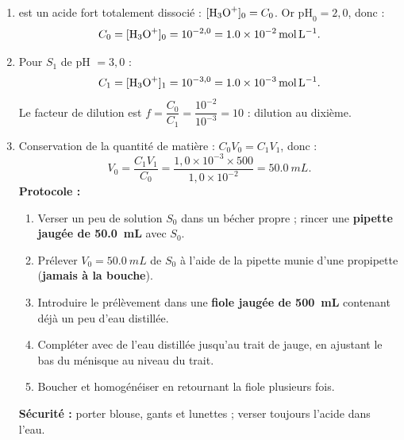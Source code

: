 \documentclass[11pt]{article}
\begin{document}
\begin{corrige}
\begin{enumerate}
\item {} est un acide fort totalement dissocié : $[\ce{H3O+}]_0 = C_0$. Or $\mathrm{pH}_0 = 2{,}0$, donc :
\[ C_0 = [\ce{H3O+}]_0 = 10^{-2{,}0} = \SI{1,0e-2}{mol.L^{-1}}. \]
\item Pour $S_1$ de pH $= 3{,}0$ :
\[ C_1 = [\ce{H3O+}]_1 = 10^{-3{,}0} = \SI{1,0e-3}{mol.L^{-1}}. \]
Le facteur de dilution est $f = \dfrac{C_0}{C_1} = \dfrac{10^{-2}}{10^{-3}} = 10$ : dilution au dixième.
\item Conservation de la quantité de matière : $C_0 V_0 = C_1 V_1$, donc :
\[ V_0 = \frac{C_1 V_1}{C_0} = \frac{1{,}0\times10^{-3} \times 500}{1{,}0\times10^{-2}} = \SI{50,0}{mL}. \]
\textbf{Protocole :}
\begin{enumerate}
\item Verser un peu de solution $S_0$ dans un bécher propre ; rincer une \textbf{pipette jaugée de \SI{50,0}{mL}} avec $S_0$.
\item Prélever $V_0 = \SI{50,0}{mL}$ de $S_0$ à l'aide de la pipette munie d'une propipette (\textbf{jamais à la bouche}).
\item Introduire le prélèvement dans une \textbf{fiole jaugée de \SI{500}{mL}} contenant déjà un peu d'eau distillée.
\item Compléter avec de l'eau distillée jusqu'au trait de jauge, en ajustant le bas du ménisque au niveau du trait.
\item Boucher et homogénéiser en retournant la fiole plusieurs fois.
\end{enumerate}
\textbf{Sécurité :} porter blouse, gants et lunettes ; verser toujours l'acide dans l'eau.
\end{enumerate}
\end{corrige}
\end{document}
